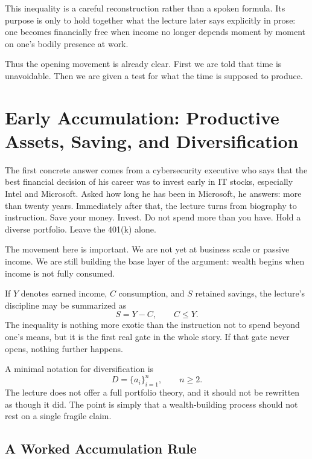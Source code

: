 \begin{remark}
This inequality is a careful reconstruction rather than a spoken formula. Its purpose is only to hold together what the lecture later says explicitly in prose: one becomes financially free when income no longer depends moment by moment on one's bodily presence at work.
\end{remark}

Thus the opening movement is already clear. First we are told that time is unavoidable. Then we are given a test for what the time is supposed to produce.

\section{Early Accumulation: Productive Assets, Saving, and Diversification}

The first concrete answer comes from a cybersecurity executive who says that the best financial decision of his career was to invest early in IT stocks, especially Intel and Microsoft. Asked how long he has been in Microsoft, he answers: more than twenty years. Immediately after that, the lecture turns from biography to instruction. Save your money. Invest. Do not spend more than you have. Hold a diverse portfolio. Leave the 401(k) alone.

The movement here is important. We are not yet at business scale or passive income. We are still building the base layer of the argument: wealth begins when income is not fully consumed.

If $Y$ denotes earned income, $C$ consumption, and $S$ retained savings, the lecture's discipline may be summarized as
\begin{equation}
S = Y - C, \qquad C \le Y.
\end{equation}
The inequality is nothing more exotic than the instruction not to spend beyond one's means, but it is the first real gate in the whole story. If that gate never opens, nothing further happens.

A minimal notation for diversification is
\begin{equation}
D=\{a_i\}_{i=1}^{n}, \qquad n \ge 2.
\end{equation}
The lecture does not offer a full portfolio theory, and it should not be rewritten as though it did. The point is simply that a wealth-building process should not rest on a single fragile claim.

\subsection{A Worked Accumulation Rule}

